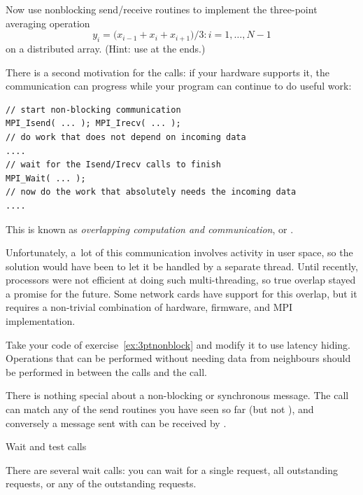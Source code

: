 \begin{exercise}
  \label{ex:3ptnonblock}
  Now use nonblocking send/receive routines to implement
  the three-point averaging operation
  \[ y_i=\bigl( x_{i-1}+x_i+x_{i+1} \bigr)/3\colon i=1,\ldots,N-1 \]
  on a distributed array. (Hint: use  at the ends.)
\end{exercise}

There is a second motivation for the  calls:
if your hardware supports it, the communication can progress
while your program can continue to do useful work:
\begin{lstlisting}
// start non-blocking communication
MPI_Isend( ... ); MPI_Irecv( ... );
// do work that does not depend on incoming data
....
// wait for the Isend/Irecv calls to finish
MPI_Wait( ... );
// now do the work that absolutely needs the incoming data
....
\end{lstlisting}
This is known as \emph{overlapping computation and communication}, or
.

Unfortunately, a~lot of this
communication involves activity in user space, so the solution would
have been to let it be handled by a separate thread. Until recently,
processors were not efficient at doing such multi-threading, so true
overlap stayed a promise for the future. Some network cards have
support for this overlap, but it requires a non-trivial combination of
hardware, firmware, and MPI implementation.

\begin{exercise}
  \label{ex:3ptnonblock-hide}
  Take your code of exercise~\ref{ex:3ptnonblock} and modify it to use
  latency hiding. Operations that can be performed without needing
  data from neighbours should be performed in between the
   calls and the  call.
\end{exercise}

\begin{remark}
  There is nothing special about a non-blocking or
  synchronous message. The  call can match any of the
  send routines you have seen so far (but not ), and
  conversely a message sent with  can be received by .
\end{remark}

 {Wait and test calls}
\label{sec:waittest}

There are several wait calls: you can wait for a single request, all
outstanding requests, or any of the outstanding requests.


